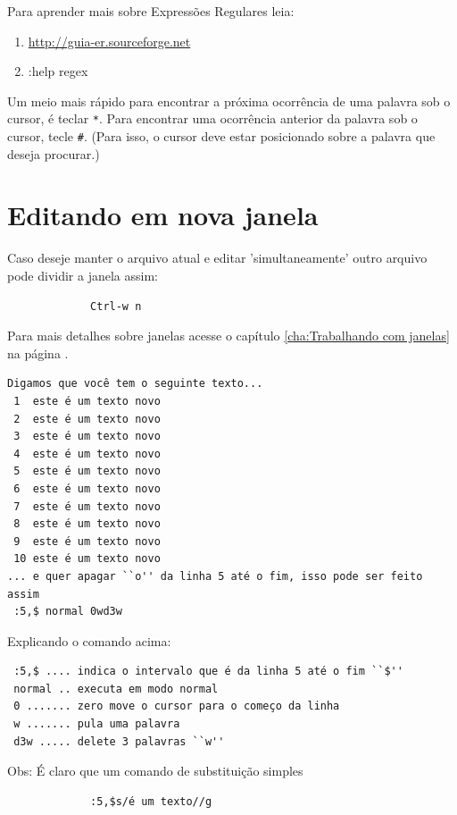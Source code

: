 \documentclass[10pt,a4paper,openany]{book}
\begin{document}
Para aprender mais sobre Expressões Regulares leia:

\begin{enumerate}
  \item \url{http://guia-er.sourceforge.net}
  \item :help regex
\end{enumerate}

Um meio mais rápido para encontrar a próxima ocorrência de
uma palavra sob o cursor, é teclar \verb|*|. Para encontrar uma ocorrência
anterior da palavra sob o cursor, tecle \verb|#|. (Para isso, o cursor deve
estar posicionado sobre a palavra que deseja procurar.)

\section{Editando em nova janela}\label{Editando em nova janela}

Caso deseje manter o arquivo atual e editar 'simultaneamente' outro arquivo
pode dividir a janela assim:

\begin{verbatim}
			 Ctrl-w n
\end{verbatim}

Para mais detalhes sobre janelas acesse o capítulo
\ref{cha:Trabalhando com janelas} na página \pageref{cha:Trabalhando
com janelas}.


\begin{verbatim}
Digamos que você tem o seguinte texto...
 1  este é um texto novo
 2  este é um texto novo
 3  este é um texto novo
 4  este é um texto novo
 5  este é um texto novo
 6  este é um texto novo
 7  este é um texto novo
 8  este é um texto novo
 9  este é um texto novo
 10 este é um texto novo
... e quer apagar ``o'' da linha 5 até o fim, isso pode ser feito assim
 :5,$ normal 0wd3w
\end{verbatim}

Explicando o comando acima:

\begin{verbatim}
 :5,$ .... indica o intervalo que é da linha 5 até o fim ``$''
 normal .. executa em modo normal
 0 ....... zero move o cursor para o começo da linha
 w ....... pula uma palavra
 d3w ..... delete 3 palavras ``w''
\end{verbatim}

Obs: É claro que um comando de substituição simples

\begin{verbatim}
			 :5,$s/é um texto//g
\end{verbatim}
\end{document}
